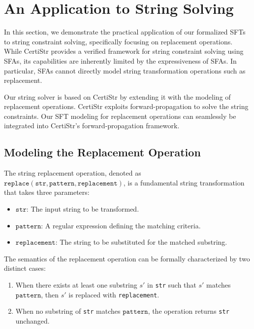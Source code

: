\documentclass[a4paper,UKenglish,cleveref, autoref, thm-restate]{lipics-v2021}
\begin{document}
\section{An Application to String Solving}
\label{sec-app-str-solver}

In this section, we demonstrate the practical application of our formalized SFTs to string constraint solving, specifically focusing on replacement operations. While CertiStr \cite{cpp/KanLRS22} provides a verified framework for string constraint solving using SFAs, its capabilities are inherently limited by the expressiveness of SFAs. In particular, SFAs cannot directly model string transformation operations such as replacement.

Our string solver is based on CertiStr \cite{cpp/KanLRS22} by extending it with the modeling of replacement operations. CertiStr exploits forward-propagation to solve the string constraints. Our SFT modeling for replacement operations can seamlessly be integrated into CertiStr's forward-propagation framework.



\subsection{Modeling the Replacement Operation}


The string replacement operation, denoted as $\texttt{replace}(\texttt{str}, \texttt{pattern}, \texttt{replacement})$, is a fundamental string transformation that takes three parameters:
\begin{itemize}
  \item $\texttt{str}$: The input string to be transformed.
  \item $\texttt{pattern}$: A regular expression defining the matching criteria.  
  \item $\texttt{replacement}$: The string to be substituted for the matched substring.
\end{itemize}

The semantics of the replacement operation can be formally characterized by two distinct cases:
\begin{enumerate}
  \item When there exists at least one substring $s'$ in \texttt{str} such that $s'$ matches $\texttt{pattern}$, then $s'$ is replaced with \texttt{replacement}.
  \item When no substring of \texttt{str} matches $\texttt{pattern}$, the operation returns \texttt{str} unchanged.
\end{enumerate}
\end{document}
